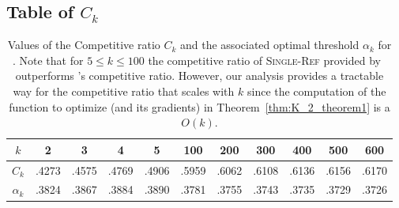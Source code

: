 \subsection{Table of $C_k$}

\begin{table}[]
    \centering
    \begin{tabular}{ccccccccccc}
     \toprule
          $k$ & 2 &3 & 4 & 5 & 100 & 200 &300 &400 & 500 & 600\\
         \midrule
        $C_k$ & .4273&.4575&.4769&.4906&.5959&.6062&.6108&.6136&.6156&.6170 \\
        $\alpha_k$ & .3824 &.3867&.3884&.3890&.3781 &.3755 &.3743&.3735&.3729&.3726 \\
        \bottomrule
    \end{tabular}
    \caption{Values of the Competitive ratio $C_k$ and the associated optimal threshold $\alpha_k$ for \algoname. Note that for $5\leq k\leq 100$ the competitive ratio of \textsc{Single-Ref} provided by~\citet{albers2020new} outperforms \algoname's competitive ratio. However, our analysis provides a tractable way for the competitive ratio that scales with $k$ since the computation of the function to optimize (and its gradients) in Theorem~\ref{thm:K_2_theorem1} is a $O(k)$.}
    \label{tab:C_k}
\end{table}